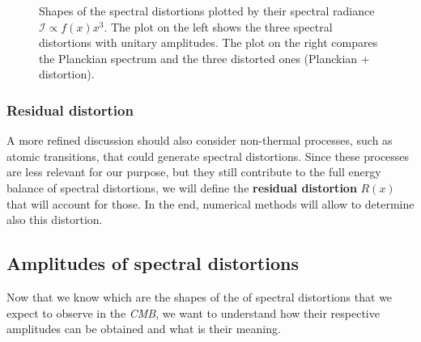 \begin{figure}
\begin{multicols}{2}
\end{multicols}
\caption{Shapes of the spectral distortions plotted by their spectral radiance $\mathcal{I}\propto f(x)x^3$. The plot on the left shows the three spectral distortions with unitary amplitudes. The plot on the right compares the Planckian spectrum and the three distorted ones (Planckian + distortion).}
\label{fig:SD_shapes}
\end{figure}

\subsubsection{Residual distortion}
A more refined discussion should also consider non-thermal processes, such as atomic transitions, that could generate spectral distortions. Since these processes are less relevant for our purpose, but they still contribute to the full energy balance of spectral distortions, we will define the \textbf{residual distortion} $R(x)$ that will account for those. In the end, numerical methods will allow to determine also this distortion.


\subsection{Amplitudes of spectral distortions}\label{sec:SD_amplitudes}
Now that we know which are the shapes of the of spectral distortions that we expect to observe in the \emph{CMB}, we want to understand how their respective amplitudes can be obtained and what is their meaning.

